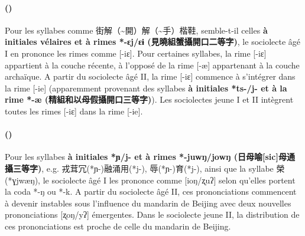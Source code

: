 \documentclass{scrbook}
\newcounter{c}[subsubsection]
\newcommand{\stpc}[1]{\stepcounter{#1}}
\newcommand{\bolang}{\textasciitilde}
\newcommand{\termyyx}[1]{\textbf{#1}}
\begin{document}
\begin{sloppypar}
\stpc{c}\paragraph{()}
Pour les syllabes comme 街解（\bolang 開）解（\bolang 手）楷鞋, semble-t-il celles \termyyx{à initiales vélaires et à rimes *-ɛj/ɛɨ (見曉組蟹攝開口二等字)}, le sociolecte âgé I en prononce les rimes comme [-iɛ]. Pour certaines syllabes, la rime [-iɛ] appartient à la couche récente, à l'opposé de la rime [-æ] appartenant à la couche archaïque. A partir du sociolecte âgé II, la rime [-iɛ] commence à s'intégrer dans la rime [-ie] (apparemment provenant des syllabes \termyyx{à initiales *ts-/j- et à la rime *-æ (精組和以母假攝開口三等字)}). Les sociolectes jeune I et II intègrent toutes les rimes [-iɛ] dans la rime [-ie].

\stpc{c}\paragraph{()}
Pour les syllabes \termyyx{à initiales *ɲ/j- et à rimes *-juwŋ/jowŋ (日母喻[sic]母通攝三等字)}, e.g. 戎茸冗(*ɲ-)融涌用(*j-), 辱(*ɲ-)育(*j-), ainsi que la syllabe 榮(*ɣjwæŋ), le sociolecte âgé I les prononce comme [ioŋ/ʐuʔ] selon qu'elles portent la coda *-ŋ ou *-k. A partir du sociolecte âgé II, ces prononciations commencent à devenir instables sous l'influence du mandarin de Beijing avec deux nouvelles prononciations [ʐoŋ/yʔ] émergentes. Dans le sociolecte jeune II, la distribution de ces prononciations est proche de celle du mandarin de Beijing.


\end{sloppypar}
\end{document}
